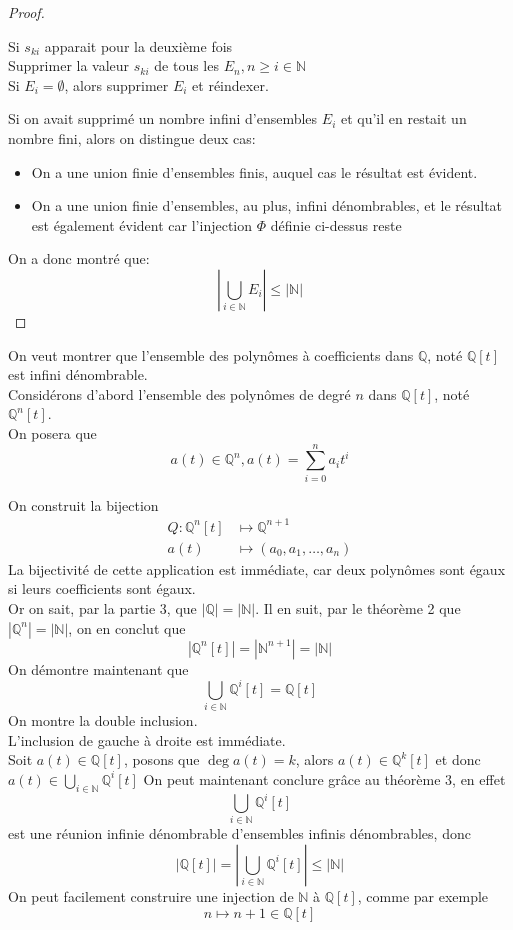 \documentclass[11pt, a4paper]{article}
\begin{document}
\begin{proof}
\begin{flushleft}
\quad \quad Si $s_{ki}$ apparait pour la deuxième fois\\
\quad \quad \quad Supprimer la valeur $s_{ki} $ de tous les $E_n, n\geq i \in \mathbb{N}$\\
\quad \quad Si $E_i = \emptyset$, alors supprimer $E_i$ et réindexer.
\end{flushleft}
Si on avait supprimé un nombre infini d'ensembles $E_i$ et qu'il en restait un nombre fini, alors on distingue deux cas:
\begin{itemize}
	\item On a une union finie d'ensembles finis, auquel cas le résultat est évident.
	\item On a une union finie d'ensembles, au plus, infini dénombrables, et le résultat est également évident car l'injection  $\Phi$ définie ci-dessus reste 
\end{itemize}

On a donc montré que:
\[ 
|\bigcup_{i \in \mathbb{N}} E_i| \leq |\mathbb{N}|
\]
\end{proof}
On veut montrer que l'ensemble des polynômes à coefficients dans $\mathbb{Q}$, noté $\mathbb{Q}[t]$ est infini dénombrable.\\
Considérons d'abord l'ensemble des polynômes de degré $n$ dans $\mathbb{Q}[t]$, noté $\mathbb{Q}^{n}[t]$.\\
On posera que 
\[ 
	a(t) \in \mathbb{Q}^{n}, a(t) = \sum_{i=0}^{ n} a_i t^{i}
\]

On construit la bijection
\begin{align*}
Q:	\mathbb{Q}^{n}[t] &\mapsto \mathbb{Q}^{n+1}\\
	a(t) &\mapsto (a_0,a_1,\ldots, a_n)
\end{align*}
La bijectivité de cette application est immédiate, car deux polynômes sont égaux si leurs coefficients sont égaux.\\
Or on sait, par la partie 3, que $|\mathbb{Q}| = |\mathbb{N}|$. Il en suit, par le théorème 2 que $|\mathbb{Q}^{n}| = |\mathbb{N}|$, on en conclut que
\[ 
	|\mathbb{Q}^{n}[t] | = |\mathbb{N}^{n+1}| = |\mathbb{N}|
\]
On démontre maintenant que
\[ 
	\bigcup_{i \in \mathbb{N}} \mathbb{Q}^{i}[t]	= \mathbb{Q}[t]	
\]
On montre la double inclusion.\\
L'inclusion de gauche à droite est immédiate.\\
Soit $a(t) \in \mathbb{Q}[t]$, posons que $\deg a(t) = k$, alors $a(t) \in \mathbb{Q}^{k}[t]$ et donc
$a(t) \in \bigcup_{i \in \mathbb{N}} \mathbb{Q}^{i}[t]$
On peut maintenant conclure grâce au théorème 3, en effet
\[ 
\bigcup_{i \in \mathbb{N}} \mathbb{Q}^{i}[t]
\]
est une réunion infinie dénombrable d'ensembles infinis dénombrables, donc
\[ 
	|\mathbb{Q}[t]|=|\bigcup_{i \in \mathbb{N}} \mathbb{Q}^{i}[t]| \leq |\mathbb{N}|
\]
On peut facilement construire une injection de $\mathbb{N}$ à $\mathbb{Q}[t]$, comme par exemple
\[ 
	n \mapsto n+1 \in \mathbb{Q}[t]
\]
\end{document}

